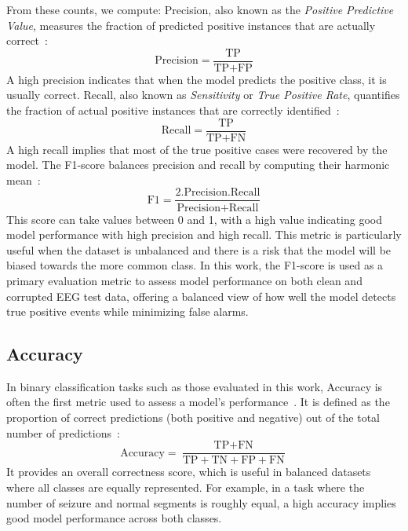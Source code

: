 From these counts, we compute: Precision, also known as the \textit{Positive Predictive Value}, measures the fraction of predicted positive instances that are actually correct~\cite{f1}:
\begin{equation}
\text{Precision} = \frac{\text{TP}}{\text{TP} + \text{FP}}
\end{equation}
A high precision indicates that when the model predicts the positive class, it is usually correct. Recall, also known as \textit{Sensitivity} or \textit{True Positive Rate}, quantifies the fraction of actual positive instances that are correctly identified~\cite{f1}:
\begin{equation}
\text{Recall} = \frac{\text{TP}}{\text{TP} + \text{FN}}
\end{equation}
A high recall implies that most of the true positive cases were recovered by the model. The F1-score balances precision and recall by computing their harmonic mean~\cite{f1}:
\begin{equation}
\text{F1} = \frac{\text{2.Precision.Recall}}{\text{Precision} + \text{Recall}}
\end{equation}
This score can take values between 0 and 1, with a high value indicating good model performance with high precision and high recall. This metric is particularly useful when the dataset is unbalanced and there is a risk that the model will be biased towards the more common class. In this work, the F1-score is used as a primary evaluation metric to assess model performance on both clean and corrupted EEG test data, offering a balanced view of how well the model detects true positive events while minimizing false alarms.

\subsection*{Accuracy}
In binary classification tasks such as those evaluated in this work, Accuracy is often the first metric used to assess a model's performance~\cite{accuracy}. It is defined as the proportion of correct predictions (both positive and negative) out of the total number of predictions~\cite{accuracy}:
\begin{equation}
\text{Accuracy} = \frac{\text{TP} + \text{FN}}{\text{TP} + \text{TN} + \text{FP} + \text{FN}}
\end{equation}
It provides an overall correctness score, which is useful in balanced datasets where all classes are equally represented. For example, in a task where the number of seizure and normal segments is roughly equal, a high accuracy implies good model performance across both classes.

